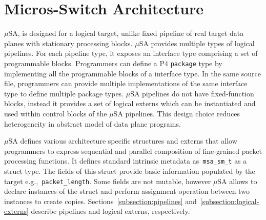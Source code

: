\section{Micros-Switch Architecture}
\label{section:micros-awitch-architecture}
$\mu$SA, is designed for a logical target, unlike fixed pipeline of real target data planes with stationary processing blocks.
$\mu$SA provides multiple types of logical pipelines.
For each pipeline type, it exposes an interface type comprising a set of programmable blocks.
Programmers can define a P4 \texttt{package} type by implementing all the programmable blocks of a interface type.
In the same source file, programmers can provide multiple implementations of the same interface type to define multiple package types.
$\mu$SA pipelines do not have fixed-function blocks, instead it provides a set of logical externs which can be instantiated and used within control blocks of the $\mu$SA pipelines.
This design choice reduces heterogeneity in abstract model of data plane programs.

$\mu$SA defines various architecture specific structures and externs that allow programmers to express sequential and parallel composition of fine-grained packet processing functions.
It defines standard intrinsic metadata as~\texttt{msa\_sm\_t} as a struct type.
The fields of this struct provide basic information populated by the target e.g.,~\texttt{packet\_length}.
Some fields are not mutable, however $\mu$SA allows to declare instances of the struct and perform assignment operation between two instances to create copies.
Sections~\ref{subsection:pipelines} and~\ref{subsection:logical-externs} describe pipelines and logical externs, respectively.



